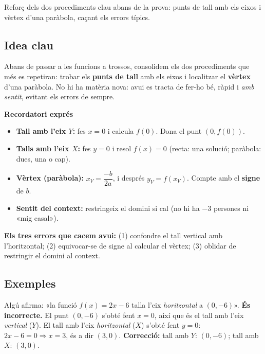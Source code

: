 %
{Reforç dels dos procediments clau abans de la prova: punts de tall amb els eixos i vèrtex d'una paràbola, caçant els errors típics.}

\subsection{Idea clau}

Abans de passar a les funcions a trossos, consolidem els dos procediments que més es
repetiran: trobar els \textbf{punts de tall} amb els eixos i localitzar el
\textbf{vèrtex} d'una paràbola. No hi ha matèria nova: avui es tracta de fer-ho bé,
ràpid i \emph{amb sentit}, evitant els errors de sempre.

\begin{idea}
\textbf{Recordatori exprés}
\begin{itemize}[leftmargin=1.4em, itemsep=2pt]
  \item \textbf{Tall amb l'eix $Y$:} fes $x=0$ i calcula $f(0)$. Dona el punt $(0,f(0))$.
  \item \textbf{Talls amb l'eix $X$:} fes $y=0$ i resol $f(x)=0$ (recta: una solució;
        paràbola: dues, una o cap).
  \item \textbf{Vèrtex (paràbola):} $x_V=\dfrac{-b}{2a}$, i després $y_V=f(x_V)$.
        Compte amb el \textbf{signe} de $b$.
  \item \textbf{Sentit del context:} restringeix el domini si cal (no hi ha
        $-3$ persones ni «mig casal»).
\end{itemize}
\textbf{Els tres errors que cacem avui:} (1) confondre el tall vertical amb
l'horitzontal; (2) equivocar-se de signe al calcular el vèrtex; (3) oblidar de
restringir el domini al context.
\end{idea}

\subsection{Exemples}

\begin{exemple}
Algú afirma: «la funció $f(x)=2x-6$ talla l'eix \emph{horitzontal} a $(0,-6)$».
\textbf{És incorrecte.} El punt $(0,-6)$ s'obté fent $x=0$, així que és el tall amb
l'eix \emph{vertical} ($Y$). El tall amb l'eix \emph{horitzontal} ($X$) s'obté fent
$y=0$: $2x-6=0 \Rightarrow x=3$, és a dir $(3,0)$. \textbf{Correcció:} tall amb $Y$:
$(0,-6)$; tall amb $X$: $(3,0)$.
\end{exemple}

